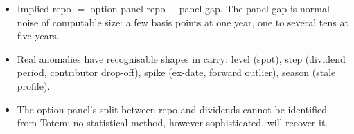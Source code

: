 \begin{retenir}
\begin{itemize}[leftmargin=12pt]
\item Implied repo $=$ option panel repo $+$ panel gap. The panel gap is normal noise of computable size: a few basis
points at one year, one to several tens at five years.
\item Real anomalies have recognisable shapes in carry: level (spot), step (dividend period, contributor drop-off),
spike (ex-date, forward outlier), season (stale profile).
\item The option panel's split between repo and dividends cannot be identified from Totem: no statistical method,
however sophisticated, will recover it.
\end{itemize}
\end{retenir}
